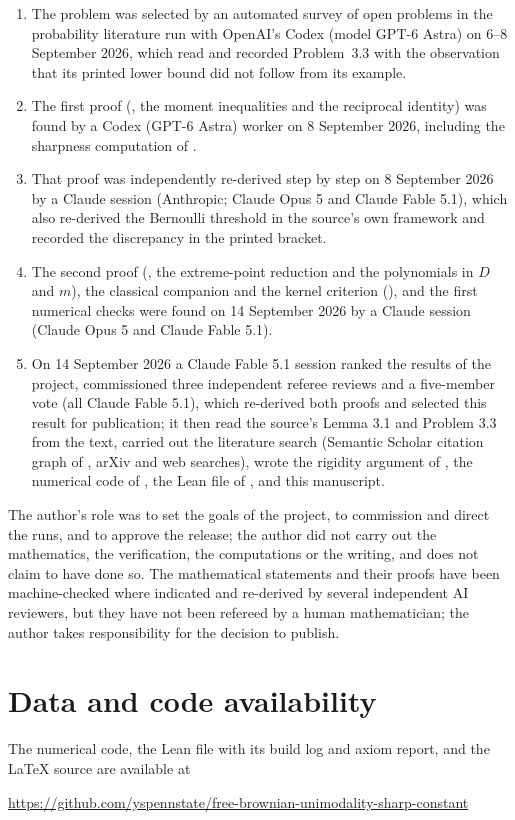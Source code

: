 \documentclass[11pt]{amsart}
\theoremstyle{definition}
\begin{document}
\begin{enumerate}
\item The problem was selected by an automated survey of open problems in the probability literature run with OpenAI's Codex (model GPT-6 Astra) on 6--8 September 2026, which read \cite{HasebeUeda} and recorded Problem~3.3 with the observation that its printed lower bound did not follow from its example.
\item The first proof (, the moment inequalities and the reciprocal identity) was found by a Codex (GPT-6 Astra) worker on 8 September 2026, including the sharpness computation of .
\item That proof was independently re-derived step by step on 8 September 2026 by a Claude session (Anthropic; Claude Opus 5 and Claude Fable 5.1), which also re-derived the Bernoulli threshold in the source's own framework and recorded the discrepancy in the printed bracket.
\item The second proof (, the extreme-point reduction and the polynomials in $D$ and $m$), the classical companion and the kernel criterion (), and the first numerical checks were found on 14 September 2026 by a Claude session (Claude Opus 5 and Claude Fable 5.1).
\item On 14 September 2026 a Claude Fable 5.1 session ranked the results of the project, commissioned three independent referee reviews and a five-member vote (all Claude Fable 5.1), which re-derived both proofs and selected this result for publication; it then read the source's Lemma 3.1 and Problem 3.3 from the text, carried out the literature search (Semantic Scholar citation graph of \cite{HasebeUeda}, arXiv and web searches), wrote the rigidity argument of , the numerical code of , the Lean file of , and this manuscript.
\end{enumerate}
The author's role was to set the goals of the project, to commission and direct the runs, and to approve the release; the author did not carry out the mathematics, the verification, the computations or the writing, and does not claim to have done so. The mathematical statements and their proofs have been machine-checked where indicated and re-derived by several independent AI reviewers, but they have not been refereed by a human mathematician; the author takes responsibility for the decision to publish.

\section*{Data and code availability}
The numerical code, the Lean file with its build log and axiom report, and the \LaTeX{} source are available at
\begin{center}
\url{https://github.com/yspennstate/free-brownian-unimodality-sharp-constant}
\end{center}
\end{document}
